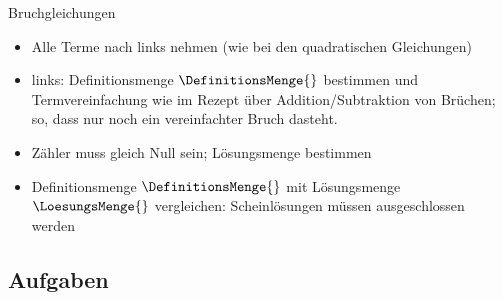 \begin{rezept}{Bruchgleichungen}{}
  \begin{itemize}
  \item Alle Terme nach links nehmen (wie bei den quadratischen Gleichungen)
  \item links: Definitionsmenge $\DefinitionsMenge{}$ bestimmen und
    Termvereinfachung wie im Rezept über Addition/Subtraktion von
    Brüchen\fi{}; so, dass nur noch ein vereinfachter Bruch dasteht.
  \item Zähler muss gleich Null sein; Lösungsmenge bestimmen
   \item Definitionsmenge $\DefinitionsMenge{}$ mit Lösungsmenge $\LoesungsMenge{}$
     vergleichen: Scheinlösungen müssen ausgeschlossen werden
  \end{itemize}
  
\end{rezept}

\subsection*{Aufgaben}







\newpage
